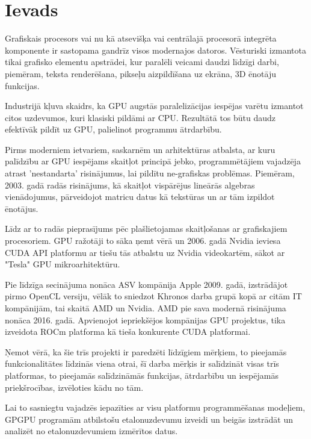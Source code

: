 \documentclass[12pt]{report}%
\theoremstyle{definition}
\begin{document}
\chapter{Ievads}
Grafiskais procesors vai nu kā atsevišķa vai centrālajā procesorā integrēta
komponente ir sastopama gandrīz visos modernajos datoros. Vēsturiski izmantota
tikai grafisko elementu apstrādei, kur paralēli veicami daudzi līdzīgi darbi,
piemēram, teksta renderēšana, pikseļu aizpildīšana uz ekrāna, 3D ēnotāju
funkcijas.

Industrijā kļuva skaidrs, ka GPU augstās paralelizācijas iespējas varētu izmantot citos
uzdevumos, kuri klasiski pildāmi ar CPU. Rezultātā tos būtu daudz efektīvāk
pildīt uz GPU, palielinot programmu ātrdarbību.

Pirms moderniem ietvariem, saskarnēm un arhitektūras atbalsta, ar kuru
palīdzību ar GPU iespējams skaitļot principā jebko, programmētājiem vajadzēja
atrast 'nestandarta' risinājumus, lai pildītu ne-grafiskas problēmas. Piemēram,
2003. gadā radās risinājums, kā skaitļot vispārējus lineārās algebras
vienādojumus, pārveidojot matricu datus kā tekstūras un ar tām izpildot
ēnotājus. \cite{10.1145/882262.882363}

Līdz ar to radās pieprasījums pēc plašlietojamas skaitļošanas ar grafiskajiem
procesoriem. GPU ražotāji to sāka ņemt vērā un 2006. gadā Nvidia ieviesa CUDA
API platformu ar tiešu tās atbalstu uz Nvidia  videokartēm, sākot ar "Tesla"
GPU mikroarhitektūru.\cite{nvidia_tesla_p100}

Pie līdzīga secinājuma nonāca ASV kompānija Apple 2009. gadā, izstrādājot pirmo
OpenCL versiju, vēlāk to sniedzot Khronos darba grupā kopā ar citām IT
kompānijām, tai skaitā AMD un Nvidia. \cite{khronos_proposal} AMD pie sava 
modernā risinājuma nonāca 2016. gadā. Apvienojot iepriekšējos kompānijas GPU
projektus, tika izveidota ROCm platforma kā tieša konkurente CUDA platformai.

Ņemot vērā, ka šie trīs projekti ir paredzēti līdzīgiem mērķiem, to pieejamās
funkcionalitātes līdzinās viena otrai, šī darba mērķis ir salīdzināt visas trīs
platformas, to pieejamās salīdzināmās funkcijas, ātrdarbību un iespējamās
priekšrocības, izvēloties kādu no tām.

Lai to sasniegtu vajadzēs iepazīties ar visu platformu programmēšanas modeļiem,
GPGPU programām atbilstošu etalonuzdevumu izveidi un beigās izstrādāt un
analizēt no etalonuzdevumiem izmērītos datus.







\end{document}
